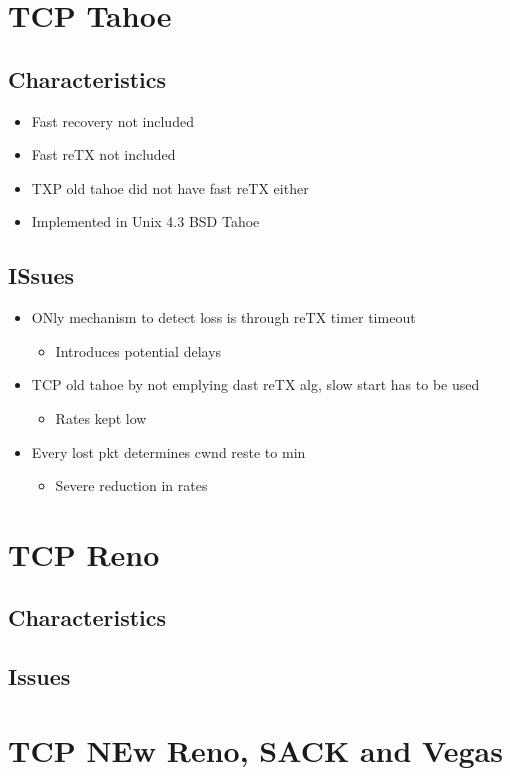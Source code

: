 \section{TCP Tahoe}
\subsection{Characteristics}
\begin{itemize}
	\item Fast recovery not included
	\item Fast reTX not included
	\item TXP old tahoe did not have fast reTX either
	\item Implemented in Unix 4.3 BSD Tahoe
\end{itemize}
\subsection{ISsues}
\begin{itemize}
	\item ONly mechanism to detect loss is through reTX timer timeout
	\begin{itemize}
		\item Introduces potential delays
	\end{itemize}
	\item TCP old tahoe by not emplying dast reTX alg, slow start has to be
		used
	\begin{itemize}
		\item Rates kept low
	\end{itemize}
	\item Every lost pkt determines cwnd reste to min
	\begin{itemize}
		\item Severe reduction in rates
	\end{itemize}
\end{itemize}
\section{TCP Reno}
\subsection{Characteristics}
\subsection{Issues}
\section{TCP NEw Reno, SACK and Vegas}
